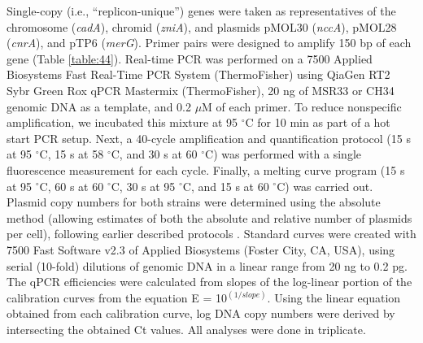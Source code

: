 Single-copy (i.e., “replicon-unique”) genes were taken as representatives of the chromosome (\textit{cadA}), chromid (\textit{zniA}), and plasmids pMOL30 (\textit{nccA}), pMOL28 (\textit{cnrA}), and pTP6 (\textit{merG}). Primer pairs were designed to amplify 150 bp of each gene (Table \ref{table:44}). Real-time PCR was performed on a 7500 Applied Biosystems Fast Real-Time PCR System (ThermoFisher) using QiaGen RT2 Sybr Green Rox qPCR Mastermix (ThermoFisher), 20 ng of MSR33 or CH34 genomic DNA as a template, and 0.2 $\mu$M of each primer. To reduce nonspecific amplification, we incubated this mixture at 95 $^{\circ}$C for 10 min as part of a hot start PCR setup. Next, a 40-cycle amplification and quantification protocol (15 s at 95 $^{\circ}$C, 15 s at 58 $^{\circ}$C, and 30 s at 60 $^{\circ}$C) was performed with a single fluorescence measurement for each cycle. Finally, a melting curve program (15 s at 95 $^{\circ}$C, 60 s at 60 $^{\circ}$C, 30 s at 95 $^{\circ}$C, and 15 s at 60 $^{\circ}$C) was carried out. Plasmid copy numbers for both strains were determined using the absolute method (allowing estimates of both the absolute and relative number of plasmids per cell), following earlier described protocols \citep{lee2006absolute}. Standard curves were created with 7500 Fast Software v2.3 of Applied Biosystems (Foster City, CA, USA), using serial (10-fold) dilutions of genomic DNA in a linear range from 20 ng to 0.2 pg. The qPCR efficiencies were calculated from slopes of the log-linear portion of the calibration curves from the equation E = 10$^{(1/slope)}$. Using the linear equation obtained from each calibration curve, log DNA copy numbers were derived by intersecting the obtained Ct values. All analyses were done in triplicate.

